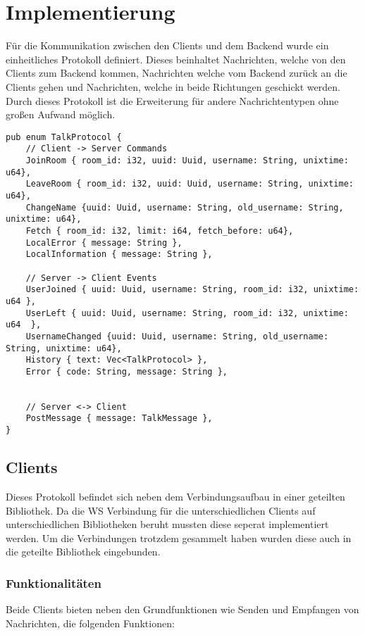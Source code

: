 
\chapter{Implementierung}
Für die Kommunikation zwischen den Clients und dem Backend wurde ein einheitliches Protokoll definiert. Dieses beinhaltet Nachrichten, welche von den Clients zum Backend kommen, Nachrichten welche vom Backend zurück an die Clients gehen und Nachrichten, welche in beide Richtungen geschickt werden. Durch dieses Protokoll ist die Erweiterung für andere Nachrichtentypen ohne großen Aufwand möglich.

\begin{lstlisting}[caption=Kommunikationsprotokoll, label=Kommunikationsprotokoll, basicstyle=\ttfamily\scriptsize]
pub enum TalkProtocol {
    // Client -> Server Commands
    JoinRoom { room_id: i32, uuid: Uuid, username: String, unixtime: u64},
    LeaveRoom { room_id: i32, uuid: Uuid, username: String, unixtime: u64},
    ChangeName {uuid: Uuid, username: String, old_username: String, unixtime: u64},
    Fetch { room_id: i32, limit: i64, fetch_before: u64},
    LocalError { message: String },
    LocalInformation { message: String },

    // Server -> Client Events
    UserJoined { uuid: Uuid, username: String, room_id: i32, unixtime: u64 },
    UserLeft { uuid: Uuid, username: String, room_id: i32, unixtime: u64  },
    UsernameChanged {uuid: Uuid, username: String, old_username: String, unixtime: u64},
    History { text: Vec<TalkProtocol> },
    Error { code: String, message: String },


    // Server <-> Client
    PostMessage { message: TalkMessage },
}
\end{lstlisting}

\section{Clients}
Dieses Protokoll befindet sich neben dem Verbindungsaufbau in einer geteilten Bibliothek. Da die \ac{WS} Verbindung für die unterschiedlichen Clients auf unterschiedlichen Bibliotheken beruht mussten diese seperat implementiert werden. Um die Verbindungen trotzdem gesammelt haben wurden diese auch in die geteilte Bibliothek eingebunden.

\subsection{Funktionalitäten}
Beide Clients bieten neben den Grundfunktionen wie Senden und Empfangen von Nachrichten, die folgenden Funktionen:

